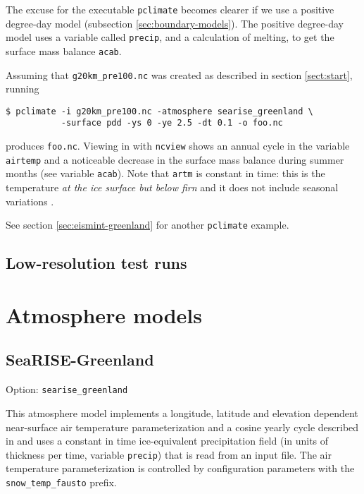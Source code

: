 \documentclass[titlepage,letterpaper,final]{scrartcl}
\def\optsection#1{%
  \def\optindex##1{\index[options]{#1!##1}}
  \def\optseealso##1{\index[options]{#1|see{##1}}}
}
\begin{document}
The excuse for the executable \texttt{pclimate} becomes clearer if we use a positive degree-day
model (subsection \ref{sec:boundary-models}).  The positive degree-day
model uses a variable called \texttt{precip}, and a calculation of melting, to get the
surface mass balance \texttt{acab}. 

Assuming that \texttt{g20km_pre100.nc} was created as described in section
\ref{sect:start}, running
\begin{verbatim}
$ pclimate -i g20km_pre100.nc -atmosphere searise_greenland \
           -surface pdd -ys 0 -ye 2.5 -dt 0.1 -o foo.nc
\end{verbatim}%
produces \texttt{foo.nc}. Viewing in with \texttt{ncview} shows an annual cycle
in the variable \texttt{airtemp} and a noticeable decrease in the surface mass
balance during summer months (see variable \texttt{acab}). Note that
\texttt{artm} is constant in time: this is the temperature \emph{at the ice
  surface but below firn} and it does not include seasonal variations \cite{Hock05}.

See section \ref{sec:eismint-greenland} for another \texttt{pclimate} example.

\subsection{Low-resolution test runs}
\label{sec:low-resolution-test-runs}

\section{Atmosphere models}
\label{sec:atmosphere}
\optsection{Climate (boundary) models!\texttt{-atmosphere} [searise_greenland, constant, given, lapse_rate, forcing]}

\subsection{SeaRISE-Greenland}

Option: \texttt{searise_greenland}

This atmosphere model implements a longitude, latitude and elevation dependent near-surface air temperature parameterization and a cosine yearly cycle described in \cite{Faustoetal2009} and uses a constant in time ice-equivalent precipitation field (in units of thickness per time, variable \texttt{precip}) that is read from an input file.  The air temperature parameterization is controlled by configuration parameters with the \texttt{snow_temp_fausto} prefix.
\end{document}

